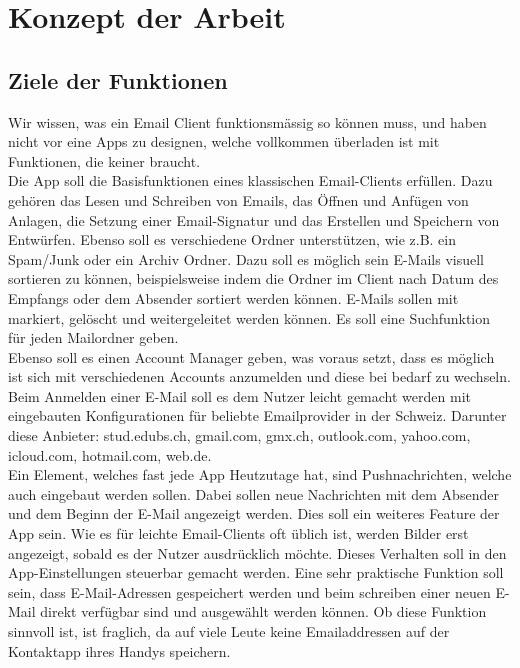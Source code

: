 \documentclass[a4paper,11pt]{article}
\begin{document}
\section{Konzept der Arbeit}

\subsection{Ziele der Funktionen}

Wir wissen, was ein Email Client funktionsmässig so können muss, und haben nicht vor eine Apps zu designen, welche vollkommen überladen ist mit Funktionen, die keiner braucht.\\

Die App soll die Basisfunktionen eines klassischen Email-Clients erfüllen. Dazu gehören das Lesen und Schreiben von Emails, das Öffnen und Anfügen von Anlagen, die Setzung einer Email-Signatur und das Erstellen und Speichern von Entwürfen. Ebenso soll es verschiedene Ordner unterstützen, wie z.B. ein Spam/Junk oder ein Archiv Ordner. Dazu soll es möglich sein E-Mails visuell sortieren zu können, beispielsweise indem die Ordner im Client nach Datum des Empfangs oder dem Absender sortiert werden können. E-Mails sollen mit markiert, gelöscht und weitergeleitet werden können. Es soll eine Suchfunktion für jeden Mailordner geben. \\

Ebenso soll es einen Account Manager geben, was voraus setzt, dass es möglich ist sich mit verschiedenen 
Accounts anzumelden und diese bei bedarf zu wechseln. Beim Anmelden einer E-Mail soll es dem Nutzer leicht gemacht werden mit eingebauten Konfigurationen für beliebte 
Emailprovider in der Schweiz. Darunter diese Anbieter: stud.edubs.ch, gmail.com, gmx.ch, outlook.com, yahoo.com, icloud.com, hotmail.com, web.de. \\

Ein Element, welches fast jede App Heutzutage hat, sind Pushnachrichten, welche auch eingebaut werden sollen. Dabei sollen neue Nachrichten mit dem Absender und dem Beginn der E-Mail angezeigt werden. 
Dies soll ein weiteres Feature der App sein. Wie es für leichte Email-Clients oft üblich ist, werden Bilder erst angezeigt, sobald es der Nutzer ausdrücklich möchte. Dieses Verhalten soll in den App-Einstellungen steuerbar gemacht werden. Eine sehr praktische Funktion soll sein, dass E-Mail-Adressen gespeichert werden und beim schreiben einer neuen E-Mail direkt verfügbar sind und ausgewählt werden können. Ob diese Funktion sinnvoll ist, ist fraglich, da auf viele Leute keine Emailaddressen auf der Kontaktapp ihres Handys speichern.\\
\end{document}
